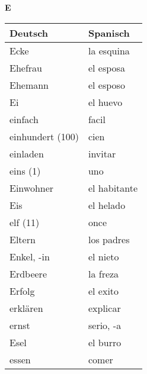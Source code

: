 \begin{flushright}\begin{Huge}\textbf{E}\end{Huge}\end{flushright}

\begin{longtable}{p{} p{}} 
\textbf{Deutsch}     & \textbf{Spanisch}                                       \\ \hline
\hline
\endhead %
Ecke & la esquina \\
Ehefrau &  el esposa\\
Ehemann & el esposo\\
Ei & el huevo\\
einfach & facil\\
einhundert (100) & cien\\
einladen & invitar\\
eins (1) & uno\\
Einwohner & el habitante\\
Eis & el helado\\
elf (11) & once\\
Eltern & los padres\\
Enkel, -in & el nieto\\
Erdbeere & la freza\\
Erfolg & el exito\\
erklären & explicar\\
ernst & serio, -a\\
Esel & el burro\\
essen & comer \\

\end{longtable}
